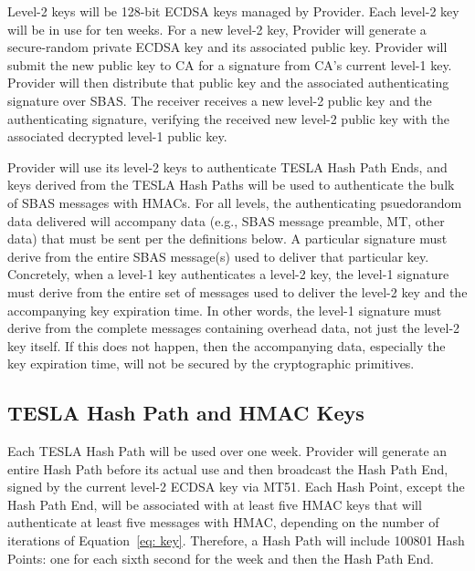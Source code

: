\documentclass[letterpaper,times]{IONconf/IONconf}
\begin{document}
		Level-2 keys will be 128-bit ECDSA keys managed by Provider.
		Each level-2 key will be in use for ten weeks.
		For a new level-2 key, Provider will generate a secure-random private ECDSA key and its associated public key.
		Provider will submit the new public key to CA for a signature from CA's current level-1 key.
		Provider will then distribute that public key and the associated authenticating signature over SBAS.
		The receiver receives a new level-2 public key and the authenticating signature, verifying the received new level-2 public key with the associated decrypted level-1 public key.

		Provider will use its level-2 keys to authenticate TESLA Hash Path Ends, and keys derived from the TESLA Hash Paths will be used to authenticate the bulk of SBAS messages with HMACs.
		For all levels, the authenticating psuedorandom data delivered will accompany data (e.g., SBAS message preamble, MT, other data) that must be sent per the definitions below.
		A particular signature must derive from the entire SBAS message(s) used to deliver that particular key.
		Concretely, when a level-1 key authenticates a level-2 key, the level-1 signature must derive from the entire set of messages used to deliver the level-2 key and the accompanying key expiration time. 
		In other words, the level-1 signature must derive from the complete messages containing overhead data, not just the level-2 key itself.
		If this does not happen, then the accompanying data, especially the key expiration time, will not be secured by the cryptographic primitives.

	\subsection{TESLA Hash Path and HMAC Keys} \label{sub:tesla_hash_path}

		Each TESLA Hash Path will be used over one week.
		Provider will generate an entire Hash Path before its actual use and then broadcast the Hash Path End, signed by the current level-2 ECDSA key via MT51.
		Each Hash Point, except the Hash Path End, will be associated with at least five HMAC keys that will authenticate at least five messages with HMAC, depending on the number of iterations of Equation~\eqref{eq: key}.
		Therefore, a Hash Path will include 100801 Hash Points: one for each sixth second for the week and then the Hash Path End.
\end{document}
